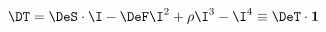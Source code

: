 \begin{equation}
  \label{eq:DT}
  \DT=\DeS\cdot\I-\DeF\I^2+\rho\I^3-\I^4 \equiv \DeT\cdot{\bf 1}
\end{equation}

